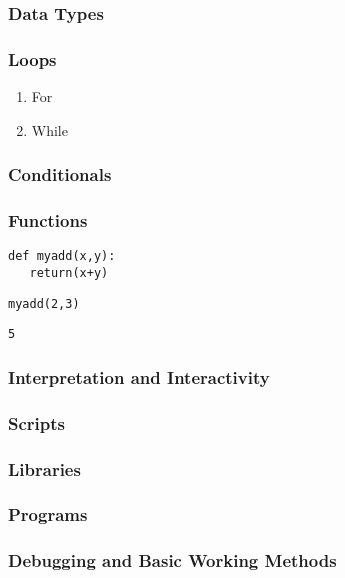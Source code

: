 \documentclass{article}
\begin{document}
\subsubsection{Data Types}
\label{sec:orgf3b65fa}
\subsubsection{Loops}
\label{sec:orgf630c6b}
\begin{enumerate}
\item For
\label{sec:org1d13c89}
\item While
\label{sec:org12fde45}
\end{enumerate}
\subsubsection{Conditionals}
\label{sec:orgf1da076}
\subsubsection{Functions}
\label{sec:orgc2bc608}
\begin{verbatim}
def myadd(x,y):
   return(x+y)
\end{verbatim}

\begin{verbatim}
myadd(2,3)
\end{verbatim}

\begin{verbatim}
5
\end{verbatim}
\subsubsection{Interpretation and Interactivity}
\label{sec:org6f98149}
\subsubsection{Scripts}
\label{sec:org8905ebb}
\subsubsection{Libraries}
\label{sec:org2619bd6}
\subsubsection{Programs}
\label{sec:org9ebdeec}
\subsubsection{Debugging and Basic Working Methods}
\label{sec:orgac987c1}
\end{document}
